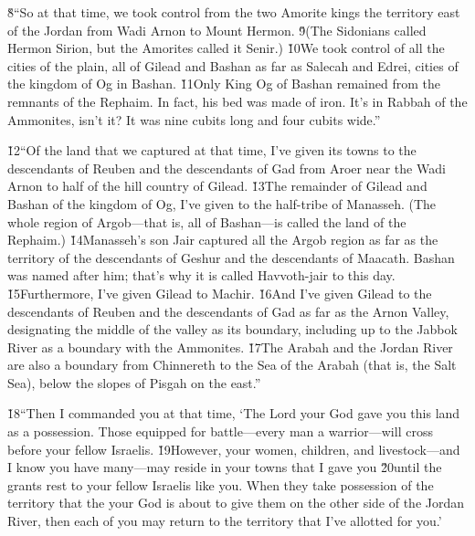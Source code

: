 \v{8}``So at that time, we took control from the two Amorite kings the territory east of the Jordan from Wadi Arnon to Mount Hermon. \v{9}(The Sidonians called Hermon Sirion, but the Amorites called it Senir.) \v{10}We took control of all the cities of the plain, all of Gilead and Bashan as far as Salecah and Edrei, cities of the kingdom of Og in Bashan. \v{11}Only King Og of Bashan remained from the remnants of the Rephaim. In fact, his bed was made of iron. It's in Rabbah of the Ammonites, isn't it? It was nine cubits long and four cubits wide.''

\v{12}``Of the land that we captured at that time, I've given its towns to the descendants of Reuben and the descendants of Gad from Aroer near the Wadi Arnon to half of the hill country of Gilead. \v{13}The remainder of Gilead and Bashan of the kingdom of Og, I've given to the half-tribe of Manasseh. (The whole region of Argob---that is, all of Bashan---is called the land of the Rephaim.) \v{14}Manasseh's son Jair captured all the Argob region as far as the territory of the descendants of Geshur and the descendants of Maacath. Bashan was named after him; that's why it is called Havvoth-jair to this day. \v{15}Furthermore, I've given Gilead to Machir. \v{16}And I've given Gilead to the descendants of Reuben and the descendants of Gad as far as the Arnon Valley, designating the middle of the valley as its boundary, including up to the Jabbok River as a boundary with the Ammonites. \v{17}The Arabah and the Jordan River are also a boundary from Chinnereth to the Sea of the Arabah (that is, the Salt Sea), below the slopes of Pisgah on the east.''

\v{18}``Then I commanded you at that time, `The Lord your God gave you this land as a possession. Those equipped for battle---every man a warrior---will cross before your fellow Israelis. \v{19}However, your women, children, and livestock---and I know you have many---may reside in your towns that I gave you \v{20}until the  grants rest to your fellow Israelis like you. When they take possession of the territory that the  your God is about to give them on the other side of the Jordan River, then each of you may return to the territory that I've allotted for you.'

